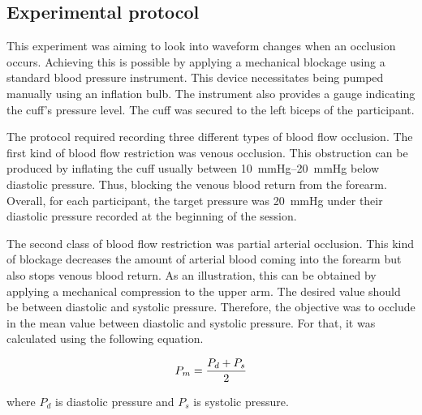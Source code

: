 
\subsection{Experimental protocol}
\label{section procedure 1.3}

This experiment was aiming to look into waveform changes when an occlusion occurs. Achieving this is possible by applying a mechanical blockage using a standard blood pressure instrument. This device necessitates being pumped manually using an inflation bulb. The instrument also provides a gauge indicating the cuff's pressure level. The cuff was secured to the left biceps of the participant. 

The protocol required recording three different types of blood flow occlusion. The first kind of blood flow restriction was venous occlusion.  This obstruction can be produced by inflating the cuff usually between \SIrange{10}{20}{\mmHg} below diastolic pressure. Thus, blocking the venous blood return from the forearm.  Overall, for each participant, the target pressure was \SI{20}{\mmHg} under their diastolic pressure recorded at the beginning of the session. 

The second class of blood flow restriction was partial arterial occlusion. This kind of blockage decreases the amount of arterial blood coming into the forearm but also stops venous blood return. As an illustration, this can be obtained by applying a mechanical compression to the upper arm. The desired value should be between diastolic and systolic pressure. Therefore, the objective was to occlude in the mean value between diastolic and systolic pressure. For that, it was calculated using the following equation.


\begin{align}
	\label{eq:meanpressure}
	P_m = \frac{P_d + P_s}{2} \tagaddtext{[\si{\mmHg}]}
\end{align}

where $P_d$ is diastolic pressure and $P_s$ is systolic pressure. 

